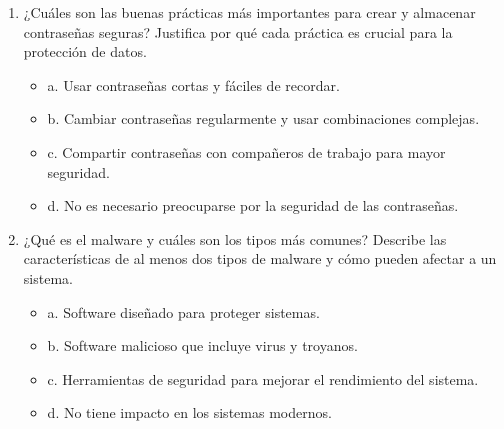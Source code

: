 \documentclass[a4paper]{article}
\begin{document}
\begin{enumerate}
    
    \item ¿Cuáles son las buenas prácticas más importantes para crear y almacenar contraseñas seguras? 
    Justifica por qué cada práctica es crucial para la protección de datos.
    \begin{itemize}
        \item a. Usar contraseñas cortas y fáciles de recordar.
        \item b. Cambiar contraseñas regularmente y usar combinaciones complejas.
        \item c. Compartir contraseñas con compañeros de trabajo para mayor seguridad.
        \item d. No es necesario preocuparse por la seguridad de las contraseñas.
    \end{itemize}
    
    \item ¿Qué es el malware y cuáles son los tipos más comunes? 
    Describe las características de al menos dos tipos de malware y cómo pueden afectar a un sistema.
    \begin{itemize}
        \item a. Software diseñado para proteger sistemas.
        \item b. Software malicioso que incluye virus y troyanos.
        \item c. Herramientas de seguridad para mejorar el rendimiento del sistema.
        \item d. No tiene impacto en los sistemas modernos.
    \end{itemize}
    

\end{enumerate}
\end{document}
